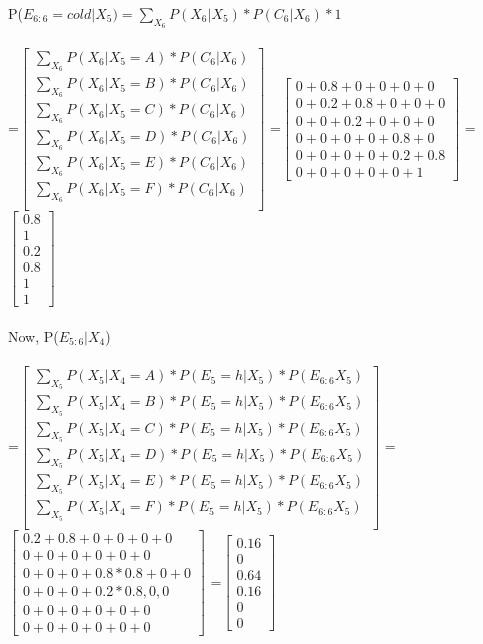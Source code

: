 \documentclass[11pt,a4paper]{article}
\begin{document}
P($E_{6:6}=cold|X_{5})=\sum_{X_{6}}P(X_{6}|X_{5})*P(C_{6}|X_{6})*1$\\\\
=$\begin{bmatrix}
\sum_{X_{6}}P(X_{6}|X_{5}=A)*P(C_{6}|X_{6})\\
\sum_{X_{6}}P(X_{6}|X_{5}=B)*P(C_{6}|X_{6})\\
\sum_{X_{6}}P(X_{6}|X_{5}=C)*P(C_{6}|X_{6})\\
\sum_{X_{6}}P(X_{6}|X_{5}=D)*P(C_{6}|X_{6})\\
\sum_{X_{6}}P(X_{6}|X_{5}=E)*P(C_{6}|X_{6})\\
\sum_{X_{6}}P(X_{6}|X_{5}=F)*P(C_{6}|X_{6})\\
\end{bmatrix}$  =$\begin{bmatrix}
0+0.8+0+0+0+0\\
0+0.2+0.8+0+0+0\\
0+0+0.2+0+0+0\\
0+0+0+0+0.8+0\\
0+0+0+0+0.2+0.8\\
0+0+0+0+0+1
\end{bmatrix}$ =$\begin{bmatrix}
0.8\\1\\0.2\\0.8\\1\\1
\end{bmatrix}$  \\\\
\newpage
Now, P($E_{5:6}|X_{4}$)\\\\
=$\begin{bmatrix}
\sum_{X_{5}}P(X_{5}|X_{4}=A)*P(E_{5}=h|X_{5})*P(E_{6:6}X_{5})\\
\sum_{X_{5}}P(X_{5}|X_{4}=B)*P(E_{5}=h|X_{5})*P(E_{6:6}X_{5})\\
\sum_{X_{5}}P(X_{5}|X_{4}=C)*P(E_{5}=h|X_{5})*P(E_{6:6}X_{5})\\
\sum_{X_{5}}P(X_{5}|X_{4}=D)*P(E_{5}=h|X_{5})*P(E_{6:6}X_{5})\\
\sum_{X_{5}}P(X_{5}|X_{4}=E)*P(E_{5}=h|X_{5})*P(E_{6:6}X_{5})\\
\sum_{X_{5}}P(X_{5}|X_{4}=F)*P(E_{5}=h|X_{5})*P(E_{6:6}X_{5})\\
\end{bmatrix}$  =$\begin{bmatrix}
0.2+0.8+0+0+0+0\\
0+0+0+0+0+0\\
0+0+0+0.8*0.8+0+0\\
0+0+0+0.2*0.8,0,0\\
0+0+0+0+0+0\\
0+0+0+0+0+0
\end{bmatrix}$ =$\begin{bmatrix}
0.16\\0\\0.64\\0.16\\0\\0
\end{bmatrix}$ \\\\
\end{document}
